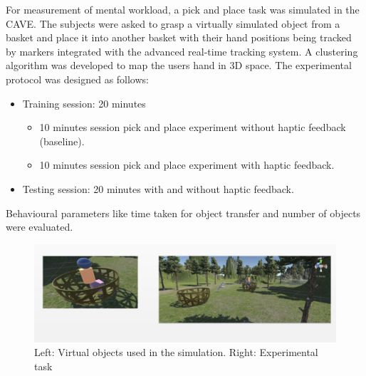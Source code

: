 \documentclass[]{article}
\begin{document}
For measurement of mental workload, a pick and place task was simulated in the CAVE. The subjects were asked to grasp a virtually simulated object from a basket and place it into another basket with their hand positions being tracked by markers integrated with the advanced real-time tracking system. A clustering algorithm was developed to map the users hand in 3D space. The experimental protocol was designed as follows:

\begin{itemize}
	\item Training session: 20 minutes
	   \begin{itemize}
	    \item 10 minutes session pick and place experiment without haptic feedback (baseline).
	    \item 10 minutes session pick and place experiment with haptic feedback.
	   \end{itemize}
	\item Testing session: 20 minutes with and without haptic feedback.
\end{itemize}

Behavioural parameters like time taken for object transfer and number of objects were evaluated.
\begin{figure}
	\centering
	\includegraphics[width=1.0\textwidth]{Capture1.jpg}
	\caption{Left: Virtual objects used in the simulation. Right: Experimental task}
	
\end{figure}
\\\\\\\\\\\\


\end{document}

